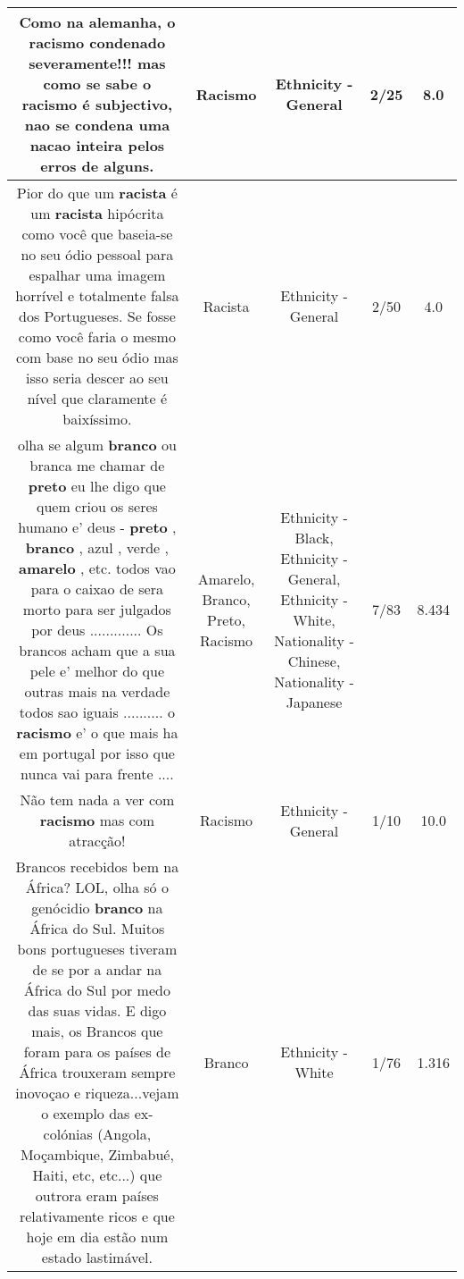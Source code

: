 \documentclass[11pt]{article}
\newlength\mylength
\begin{document}
\begin{center}
\begin{longtable}{|C{.65\mylength}|C{.30\mylength}|C{.12\mylength}|C{.12\mylength}|C{.12\mylength}|}
  \small Como na alemanha, o \textbf{racismo} condenado severamente!!! mas como se sabe o \textbf{racismo} é subjectivo, nao se condena uma nacao inteira pelos erros de alguns.\normalsize   & Racismo & Ethnicity - General & 2/25 & 8.0 \\  \hline
  \small Pior do que um \textbf{racista} é um \textbf{racista} hipócrita como você que baseia-se no seu ódio pessoal para espalhar uma imagem horrível e totalmente falsa dos Portugueses. Se fosse como você faria o mesmo com base no seu ódio mas isso seria descer ao seu nível que claramente é baixíssimo.\normalsize   & Racista & Ethnicity - General & 2/50 & 4.0 \\  \hline
  \small olha se algum \textbf{branco} ou branca me chamar de \textbf{preto} eu lhe digo que quem criou os seres humano e' deus - \textbf{preto} , \textbf{branco} , azul , verde , \textbf{a\textbf{marelo}} , etc. todos vao para o caixao de sera morto para ser julgados por deus ............. Os brancos acham que a sua pele e' melhor do que outras mais na verdade todos sao iguais .......... o \textbf{racismo} e' o que mais ha em portugal por isso que nunca vai para frente ....\normalsize   & Amarelo, Branco, Preto, Racismo & Ethnicity - Black, Ethnicity - General, Ethnicity - White, Nationality - Chinese, Nationality - Japanese & 7/83 & 8.434 \\  \hline
  \small Não tem nada a ver com \textbf{racismo} mas com atracção!\normalsize   & Racismo & Ethnicity - General & 1/10 & 10.0 \\  \hline
  \small Brancos recebidos bem na África? LOL, olha só o genócidio \textbf{branco} na África do Sul. Muitos bons portugueses tiveram de se por a andar na África do Sul por medo das suas vidas. E digo mais, os Brancos que foram para os países de África trouxeram sempre inovoçao e riqueza...vejam o exemplo das ex- colónias (Angola, Moçambique, Zimbabué, Haiti, etc, etc...) que outrora eram países relativamente ricos e que hoje em dia estão num estado lastimável.\normalsize   & Branco & Ethnicity - White & 1/76 & 1.316 \\  \hline

\end{longtable}
\end{center}
\end{document}
